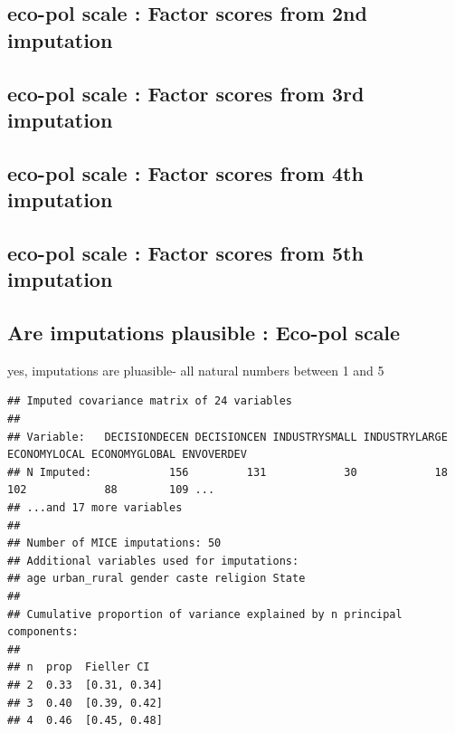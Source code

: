 \documentclass[
]{article}
\begin{document}
\renewcommand*{\arraystretch}{1}

\hypertarget{eco-pol-scale-factor-scores-from-2nd-imputation}{%
\subsection{eco-pol scale : Factor scores from 2nd
imputation}\label{eco-pol-scale-factor-scores-from-2nd-imputation}}

\hypertarget{eco-pol-scale-factor-scores-from-3rd-imputation}{%
\subsection{eco-pol scale : Factor scores from 3rd
imputation}\label{eco-pol-scale-factor-scores-from-3rd-imputation}}

\hypertarget{eco-pol-scale-factor-scores-from-4th-imputation}{%
\subsection{eco-pol scale : Factor scores from 4th
imputation}\label{eco-pol-scale-factor-scores-from-4th-imputation}}

\hypertarget{eco-pol-scale-factor-scores-from-5th-imputation}{%
\subsection{eco-pol scale : Factor scores from 5th
imputation}\label{eco-pol-scale-factor-scores-from-5th-imputation}}

\hypertarget{are-imputations-plausible-eco-pol-scale}{%
\subsection{Are imputations plausible : Eco-pol
scale}\label{are-imputations-plausible-eco-pol-scale}}

yes, imputations are pluasible- all natural numbers between 1 and 5

\begin{verbatim}
## Imputed covariance matrix of 24 variables
## 
## Variable:   DECISIONDECEN DECISIONCEN INDUSTRYSMALL INDUSTRYLARGE ECONOMYLOCAL ECONOMYGLOBAL ENVOVERDEV 
## N Imputed:            156         131            30            18          102            88        109 ...
## ...and 17 more variables
## 
## Number of MICE imputations: 50
## Additional variables used for imputations:
## age urban_rural gender caste religion State
## 
## Cumulative proportion of variance explained by n principal components:
## 
## n  prop  Fieller CI    
## 2  0.33  [0.31, 0.34]  
## 3  0.40  [0.39, 0.42]  
## 4  0.46  [0.45, 0.48]
\end{verbatim}
\end{document}
